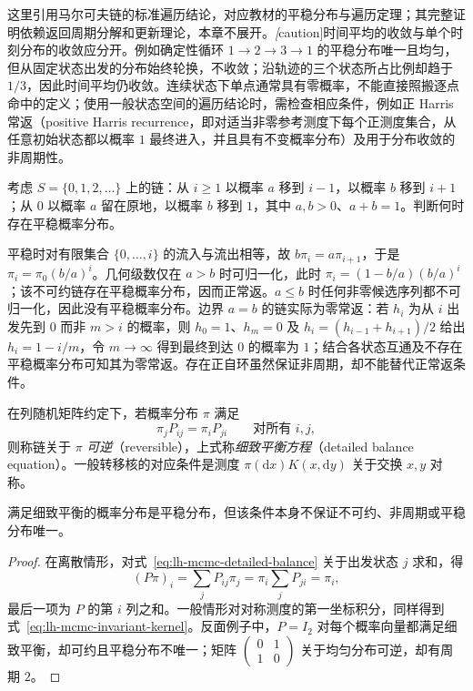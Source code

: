 这里引用马尔可夫链的标准遍历结论，对应教材的平稳分布与遍历定理；其完整证明依赖返回周期分解和更新理论，本章不展开。\emph[caution]{时间平均的收敛与单个时刻分布的收敛应分开。}例如确定性循环 $1\to2\to3\to1$ 的平稳分布唯一且均匀，但从固定状态出发的分布始终轮换，不收敛；沿轨迹的三个状态所占比例却趋于 $1/3$，因此时间平均仍收敛。连续状态下单点通常具有零概率，不能直接照搬逐点命中的定义；使用一般状态空间的遍历结论时，需检查相应条件，例如正 Harris 常返（positive Harris recurrence，即对适当非零参考测度下每个正测度集合，从任意初始状态都以概率 $1$ 最终进入，并且具有不变概率分布）及用于分布收敛的非周期性。

\begin{example}
\label{ex:lh-mcmc-birth-death}
考虑 $S=\{0,1,2,\ldots\}$ 上的链：从 $i\geq1$ 以概率 $a$ 移到 $i-1$，以概率 $b$ 移到 $i+1$；从 $0$ 以概率 $a$ 留在原地，以概率 $b$ 移到 $1$，其中 $a,b>0$、$a+b=1$。判断何时存在平稳概率分布。
\end{example}
\begin{solve}
平稳时对有限集合 $\{0,\ldots,i\}$ 的流入与流出相等，故 $b\pi_i=a\pi_{i+1}$，于是 $\pi_i=\pi_0(b/a)^i$。几何级数仅在 $a>b$ 时可归一化，此时 $\pi_i=(1-b/a)(b/a)^i$；该不可约链存在平稳概率分布，因而正常返。$a\leq b$ 时任何非零候选序列都不可归一化，因此没有平稳概率分布。边界 $a=b$ 的链实际为零常返：若 $h_i$ 为从 $i$ 出发先到 $0$ 而非 $m>i$ 的概率，则 $h_0=1$、$h_m=0$ 及 $h_i=(h_{i-1}+h_{i+1})/2$ 给出 $h_i=1-i/m$，令 $m\to\infty$ 得到最终到达 $0$ 的概率为 $1$；结合各状态互通及不存在平稳概率分布可知其为零常返。存在正自环虽然保证非周期，却不能替代正常返条件。
\end{solve}

\begin{definition}[细致平衡与可逆性]
\label{def:lh-mcmc-reversibility}
在列随机矩阵约定下，若概率分布 $\pi$ 满足
\begin{equation}
\pi_jP_{ij}=\pi_iP_{ji}\qquad\text{对所有 }i,j,
\label{eq:lh-mcmc-detailed-balance}
\end{equation}
则称链关于 $\pi$ \emph{可逆}（reversible），上式称\emph{细致平衡方程}（detailed balance equation）。一般转移核的对应条件是测度 $\pi(\mathrm dx)K(x,\mathrm dy)$ 关于交换 $x,y$ 对称。
\end{definition}

\begin{proposition}[细致平衡蕴含不变性]
\label{prop:lh-mcmc-balance-invariance}
满足细致平衡的概率分布是平稳分布，但该条件本身不保证不可约、非周期或平稳分布唯一。
\end{proposition}
\begin{proof}
在离散情形，对式~\eqref{eq:lh-mcmc-detailed-balance} 关于出发状态 $j$ 求和，得
\[
(P\pi)_i=\sum_jP_{ij}\pi_j
=\pi_i\sum_jP_{ji}=\pi_i,
\]
最后一项为 $P$ 的第 $i$ 列之和。一般情形对对称测度的第一坐标积分，同样得到式~\eqref{eq:lh-mcmc-invariant-kernel}。反面例子中，$P=I_2$ 对每个概率向量都满足细致平衡，却可约且平稳分布不唯一；矩阵 $\left(\begin{smallmatrix}0&1\\1&0\end{smallmatrix}\right)$ 关于均匀分布可逆，却有周期 $2$。
\end{proof}

